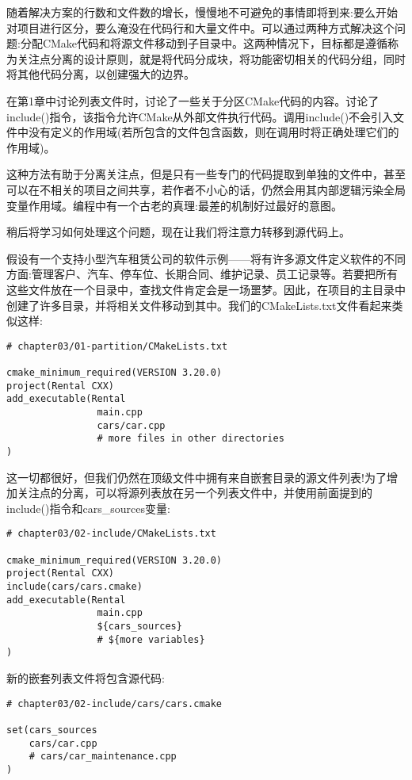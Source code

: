 
随着解决方案的行数和文件数的增长，慢慢地不可避免的事情即将到来:要么开始对项目进行区分，要么淹没在代码行和大量文件中。可以通过两种方式解决这个问题:分配CMake代码和将源文件移动到子目录中。这两种情况下，目标都是遵循称为关注点分离的设计原则，就是将代码分成块，将功能密切相关的代码分组，同时将其他代码分离，以创建强大的边界。

在第1章中讨论列表文件时，讨论了一些关于分区CMake代码的内容。讨论了include()指令，该指令允许CMake从外部文件执行代码。调用include()不会引入文件中没有定义的作用域(若所包含的文件包含函数，则在调用时将正确处理它们的作用域)。

这种方法有助于分离关注点，但是只有一些专门的代码提取到单独的文件中，甚至可以在不相关的项目之间共享，若作者不小心的话，仍然会用其内部逻辑污染全局变量作用域。编程中有一个古老的真理:最差的机制好过最好的意图。

稍后将学习如何处理这个问题，现在让我们将注意力转移到源代码上。

假设有一个支持小型汽车租赁公司的软件示例——将有许多源文件定义软件的不同方面:管理客户、汽车、停车位、长期合同、维护记录、员工记录等。若要把所有这些文件放在一个目录中，查找文件肯定会是一场噩梦。因此，在项目的主目录中创建了许多目录，并将相关文件移动到其中。我们的CMakeLists.txt文件看起来类似这样:

\begin{lstlisting}[style=styleCMake]
# chapter03/01-partition/CMakeLists.txt

cmake_minimum_required(VERSION 3.20.0)
project(Rental CXX)
add_executable(Rental
				main.cpp
				cars/car.cpp
				# more files in other directories
)
\end{lstlisting}

这一切都很好，但我们仍然在顶级文件中拥有来自嵌套目录的源文件列表!为了增加关注点的分离，可以将源列表放在另一个列表文件中，并使用前面提到的include()指令和cars\_sources变量:

\begin{lstlisting}[style=styleCMake]
# chapter03/02-include/CMakeLists.txt

cmake_minimum_required(VERSION 3.20.0)
project(Rental CXX)
include(cars/cars.cmake)
add_executable(Rental
				main.cpp
				${cars_sources}
				# ${more variables}
)
\end{lstlisting}

新的嵌套列表文件将包含源代码:

\begin{lstlisting}[style=styleCMake]
# chapter03/02-include/cars/cars.cmake

set(cars_sources
	cars/car.cpp
	# cars/car_maintenance.cpp
)
\end{lstlisting}


